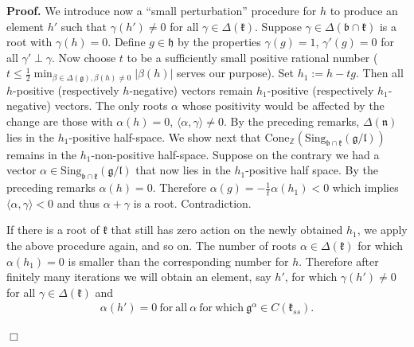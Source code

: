 \documentclass[12pt]{report}
\newenvironment{proof}[1][]{ \textbf{Proof#1. }}{$\Box$\medskip}
\newcommand {\ZZ} {\mathbb {Z}}
\newcommand{\kk}{\mathfrak{k}}
\newcommand{\nn}{\mathfrak{n}}
\newcommand{\hh}{\mathfrak{h}}
\newcommand{\gG}{\mathfrak{g}}
\newcommand{\bb}{\mathfrak{b}}
\newcommand{\lL}{\mathfrak{l}}
\newcommand{\half}{\frac{1}{2}}
\newcommand{\Cone}{\mathrm{Cone}}
\newcommand{\hw}{\mathrm{Sing}}
\begin{document}
\begin{proof}
We introduce now a ``small perturbation'' procedure for $h$ to produce an element $h'$  such that $\gamma(h')\neq 0$ for all $\gamma\in\Delta(\kk)$. Suppose $\gamma\in \Delta(\bb\cap\kk)$ is a root with $\gamma(h)=0$. Define $g\in\hh$ by the properties $\gamma(g)=1$, $\gamma'(g)=0$ for all $\gamma'\perp\gamma$. Now choose $t$ to be a sufficiently small positive rational number ($t\leq\half \min_{\beta \in \Delta(\gG), \beta(h)\neq 0}{|\beta(h)|}$ serves our purpose). Set $h_{1}:=h- tg$. Then all $h$-positive (respectively $h$-negative) vectors remain $h_1$-positive (respectively $h_1$-negative) vectors. The only roots $\alpha$ whose positivity would be affected by the change are those with $\alpha(h)=0$, $\langle\alpha,\gamma\rangle\neq 0$. By the preceding remarks, $\Delta(\nn)$ lies in the $h_1$-positive half-space. We show next that $\Cone_{\ZZ} (\hw_{\bb\cap\kk} (\gG/\lL))$ remains in the $h_1$-non-positive half-space. Suppose on the contrary we had a vector $\alpha\in \hw_{\bb \cap \kk}( \gG/ \lL)$ that now lies in the $h_1$-positive half space. By the preceding remarks $\alpha(h)=0$. Therefore $\alpha(g)= -\frac{1}{t}\alpha(h_1)<0$ which implies $\langle\alpha,\gamma\rangle <0$ and thus $\alpha+\gamma$ is a root. Contradiction. 

If there is a root of $\kk$ that still has zero action on the newly obtained $h_1$, we apply the above procedure again, and so on. The number of roots $\alpha\in\Delta(\kk)$ for which $\alpha(h_1)=0$ is smaller than the corresponding number for $h$. Therefore after finitely many iterations we will obtain an element, say $h'$, for which $\gamma(h')\neq 0$ for all $\gamma\in\Delta(\kk)$ and
\begin{equation}\label{eqTheCondition2}
\begin{array}{c}
\alpha(h')=0 \mathrm{~for~all~} \alpha \mathrm{~for~which~}\gG^\alpha\in C(\kk_{ss}).
\end{array}
\end{equation}



\end{proof}
\end{document}
